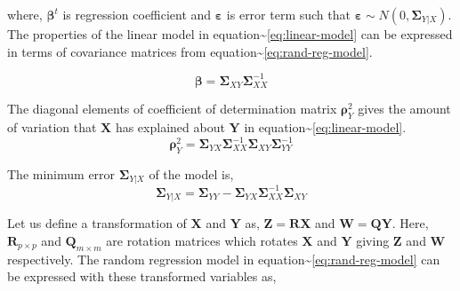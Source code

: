 \documentclass[12pt,A4paper,authoryear]{elsarticle} %
\providecommand{\tightlist}{%
  \setlength{\itemsep}{0pt}\setlength{\parskip}{0pt}}
\begin{document}
where, \(\boldsymbol{\beta}^t\) is regression coefficient and
\(\boldsymbol{\varepsilon}\) is error term such that
\(\boldsymbol{\varepsilon} \sim N\left(0, \boldsymbol{\Sigma}_{Y|X}\right)\).
The properties of the linear model in
equation\textasciitilde{}\eqref{eq:linear-model} can be expressed in terms
of covariance matrices from
equation\textasciitilde{}\eqref{eq:rand-reg-model}.

\begin{description}
\tightlist
\item[Regression Coefficients]
\[ \boldsymbol{\beta} = \boldsymbol{\Sigma}_{XY} \boldsymbol{\Sigma}_{XX}^{-1}\]
\item[Coefficient of Determination \(\boldsymbol{\rho}_Y^2\)]
The diagonal elements of coefficient of determination matrix
\(\boldsymbol{\rho}_Y^2\) gives the amount of variation that
\(\boldsymbol{X}\) has explained about \(\boldsymbol{Y}\) in
equation\textasciitilde{}\eqref{eq:linear-model}.
\[\boldsymbol{\rho}_Y^2 = \boldsymbol{\Sigma}_{YX}\boldsymbol{\Sigma}_{XX}^{-1}\boldsymbol{\Sigma}_{XY}\boldsymbol{\Sigma}_{YY}^{-1}\]
\item[Error variance]
The minimum error \(\boldsymbol{\Sigma}_{Y|X}\) of the model is,
\[\boldsymbol{\Sigma}_{Y|X} = \boldsymbol{\Sigma}_{YY} - \boldsymbol{\Sigma}_{YX}\boldsymbol{\Sigma}_{XX}^{-1}\boldsymbol{\Sigma}_{XY}\]
\end{description}

Let us define a transformation of \(\boldsymbol{X}\) and
\(\boldsymbol{Y}\) as, \(\mathbf{Z} = \mathbf{RX}\) and
\(\mathbf{W} = \mathbf{QY}\). Here, \(\mathbf{R}_{p\times p}\) and
\(\mathbf{Q}_{m\times m}\) are rotation matrices which rotates
\(\mathbf{X}\) and \(\mathbf{Y}\) giving \(\mathbf{Z}\) and
\(\mathbf{W}\) respectively. The random regression model in
equation\textasciitilde{}\eqref{eq:rand-reg-model} can be expressed with
these transformed variables as,
\end{document}
